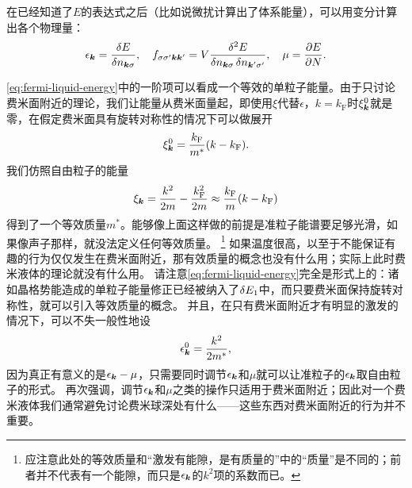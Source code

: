 \documentclass[hyperref, UTF8, a4paper]{ctexart}
\begin{document}
在已经知道了$E$的表达式之后（比如说微扰计算出了体系能量），可以用变分计算出各个物理量：
\begin{equation}
    \epsilon_{\vb*{k}} = \fdv{E}{n_{\vb*{k} \sigma}} , \quad f_{\sigma \sigma' \vb*{k} \vb*{k}'} = V \frac{\var[2]{E}}{\var{n_{\vb*{k} \sigma}}\var{n_{\vb*{k}' \sigma'}}}, \quad \mu = \pdv{E}{N}.
\end{equation}

\eqref{eq:fermi-liquid-energy}中的一阶项可以看成一个等效的单粒子能量。由于只讨论费米面附近的理论，我们让能量从费米面量起，即使用$\xi$代替$\epsilon$，$k=k_\text{F}$时$\xi^0_{\vb*{k}}$就是零，在假定费米面具有旋转对称性的情况下可以做展开
\[
    \xi^0_{\vb*{k}} = \frac{k_\text{F}}{m^*} (k - k_\text{F}).
\]
我们仿照自由粒子的能量
\[
    \xi_{\vb*{k}} = \frac{k^2}{2m} - \frac{k_\text{F}^2}{2m} \approx \frac{k_\text{F}}{m} (k - k_\text{F})
\]
得到了一个等效质量$m^*$。能够像上面这样做的前提是准粒子能谱要足够光滑，如果像声子那样，就没法定义任何等效质量。%
\footnote{应注意此处的等效质量和“激发有能隙，是有质量的”中的“质量”是不同的；前者并不代表有一个能隙，而只是$\epsilon_{\vb*{k}}$的$k^2$项的系数而已。}%
如果温度很高，以至于不能保证有趣的行为仅仅发生在费米面附近，那有效质量的概念也没有什么用；实际上此时费米液体的理论就没有什么用。
请注意\eqref{eq:fermi-liquid-energy}完全是形式上的：诸如晶格势能造成的单粒子能量修正已经被纳入了$\var{E_1}$中，而只要费米面保持旋转对称性，就可以引入等效质量的概念。
并且，在只有费米面附近才有明显的激发的情况下，可以不失一般性地设
\[
    \epsilon_{\vb*{k}}^0 = \frac{k^2}{2m^*},
\]
因为真正有意义的是$\epsilon_{\vb*{k}} - \mu$，只需要同时调节$\epsilon_{\vb*{k}}$和$\mu$就可以让准粒子的$\epsilon_{\vb*{k}}$取自由粒子的形式。
再次强调，调节$\epsilon_{\vb*{k}}$和$\mu$之类的操作只适用于费米面附近；因此对一个费米液体我们通常避免讨论费米球深处有什么——这些东西对费米面附近的行为并不重要。
\end{document}

